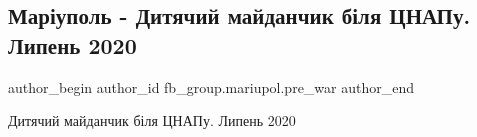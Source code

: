  
 
 
 
 

\subsection{Маріуполь - Дитячий майданчик біля ЦНАПу. Липень 2020}
\label{sec:15_01_2023.fb.fb_group.mariupol.pre_war.2.mar_upol___dityachii}

\ifcmt
 author_begin
   author_id fb_group.mariupol.pre_war
 author_end
\fi

Дитячий майданчик біля ЦНАПу. Липень 2020
